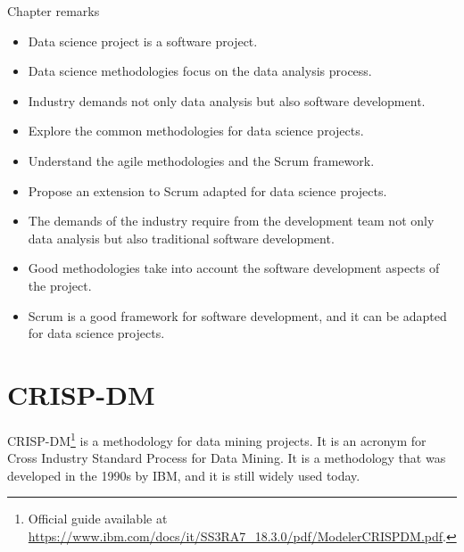 \begin{mainbox}{Chapter remarks}


  \startcontents[chapters]
  \vspace{1em}


  \begin{itemize}
    \itemsep0em
    \item Data science project is a software project.
    \item Data science methodologies focus on the data analysis process.
    \item Industry demands not only data analysis but also software development.
  \end{itemize}


  \begin{itemize}
    \itemsep0em
    \item Explore the common methodologies for data science projects.
    \item Understand the agile methodologies and the Scrum framework.
    \item Propose an extension to Scrum adapted for data science projects.
  \end{itemize}


  \begin{itemize}
    \itemsep0em
    \item The demands of the industry require from the development team not only data
      analysis but also traditional software development.
    \item Good methodologies take into account the software development aspects of the
      project.
    \item Scrum is a good framework for software development, and it can be adapted for
      data science projects.
  \end{itemize}
\end{mainbox}

{}
\clearpage

\section{CRISP-DM}

CRISP-DM\footnote{Official guide available at
\url{https://www.ibm.com/docs/it/SS3RA7_18.3.0/pdf/ModelerCRISPDM.pdf}.} is a methodology
for data mining projects.  It is an acronym for Cross Industry Standard Process for Data
Mining.  It is a methodology that was developed in the 1990s by IBM, and it is still
widely used today.

